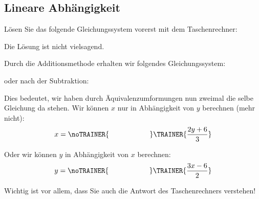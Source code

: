 \subsection{Lineare Abhängigkeit}

Lösen Sie das folgende Gleichungssystem vorerst mit dem
Taschenrechner:


Die Lösung ist nicht vielsagend.

Durch die Additionsmethode erhalten wir folgendes Gleichungssystem:


oder nach der Subtraktion:


Dies bedeutet, wir haben durch Äquivalenzumformungen nun zweimal die selbe
Gleichung da stehen. Wir können $x$ nur in Abhängigkeit von $y$
berechnen (mehr nicht):
$$x=\noTRAINER{\hspace{20mm}}\TRAINER{\frac{2y+6}{3}}$$

Oder wir können $y$ in Abhängigkeit von $x$ berechnen:
$$y=\noTRAINER{\hspace{20mm}}\TRAINER{\frac{3x-6}{2}}$$

Wichtig ist vor allem, dass Sie auch die Antwort des Taschenrechners verstehen!
\newpage
